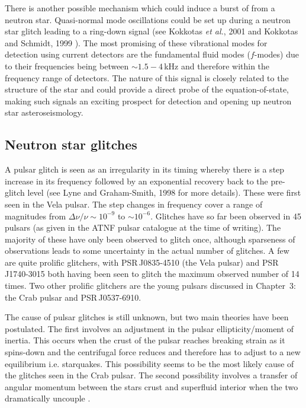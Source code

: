 There is another possible mechanism which could induce a burst of \gws from a neutron star.
Quasi-normal mode oscillations could be set up during a neutron star glitch leading to a \gw
ring-down signal (see Kokkotas {\it et al.}, 2001 and Kokkotas and Schmidt, 1999
\cite{Kokkotas:2001, Kokkotas:1999}). The most promising of these vibrational modes for detection
using current \gw detectors are the fundamental fluid modes ($f$-modes) due to their frequencies
being between $\sim 1.5 - 4$\,kHz \cite{AnderssonKokkotas:1998} and therefore within the frequency
range of detectors. The nature of this signal is closely related to the structure of the star and
could provide a direct probe of the equation-of-state, making such signals an exciting prospect for
detection and opening up neutron star asteroseismology.

\subsection{Neutron star glitches}
A pulsar glitch is seen as an irregularity in its timing whereby there is a step increase in
its frequency followed by an exponential recovery back to the pre-glitch level (see Lyne and
Graham-Smith, 1998 \cite{PulsarAstronomy} for more details). These were first seen in the Vela
pulsar. The step changes in frequency cover a range of magnitudes from $\Delta\nu/\nu \sim 10^{-9}$
to $\sim10^{-6}$. Glitches have so far been observed in 45 pulsars (as given in the ATNF pulsar
catalogue \cite{ATNF} at the time of writing). The majority of these have only been observed to
glitch once, although sparseness of observations leads to some uncertainty in the actual number of
glitches. A few are quite prolific glitchers, with PSR\,J0835-4510 (the Vela pulsar) and
PSR\,J1740-3015 both having been seen to glitch the maximum observed number of 14 times. Two other
prolific glitchers are the young pulsars discussed in Chapter~3: the Crab pulsar and
PSR\,J0537-6910.
 
The cause of pulsar glitches is still unknown, but two main theories have been postulated. The
first involves an adjustment in the pulsar ellipticity/moment of inertia. This occurs when the crust
of the pulsar reaches breaking strain as it spins-down and the centrifugal force reduces and
therefore has to adjust to a new equilibrium \cite{PulsarAstronomy} i.e. starquakes. This
possibility seems to be the most likely cause of the glitches seen in the Crab pulsar.
The second possibility involves a transfer of angular momentum between the stars crust and
superfluid interior when the two dramatically uncouple \cite{PulsarAstronomy}.

